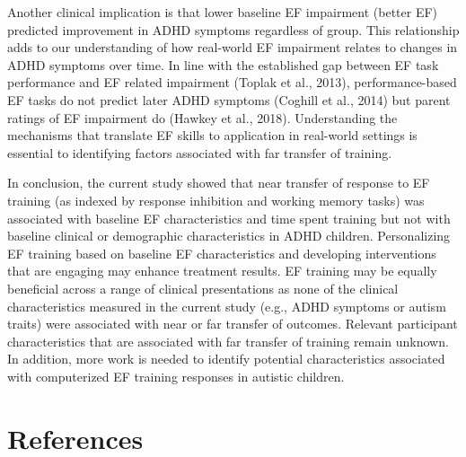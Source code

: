 \documentclass[
  letterpaper,
]{ut-thesis}
\begin{document}
Another clinical implication is that lower baseline EF impairment
(better EF) predicted improvement in ADHD symptoms regardless of group.
This relationship adds to our understanding of how real-world EF
impairment relates to changes in ADHD symptoms over time. In line with
the established gap between EF task performance and EF related
impairment (Toplak et al., 2013), performance-based EF tasks do not
predict later ADHD symptoms (Coghill et al., 2014) but parent ratings of
EF impairment do (Hawkey et al., 2018). Understanding the mechanisms
that translate EF skills to application in real-world settings is
essential to identifying factors associated with far transfer of
training.

In conclusion, the current study showed that near transfer of response
to EF training (as indexed by response inhibition and working memory
tasks) was associated with baseline EF characteristics and time spent
training but not with baseline clinical or demographic characteristics
in ADHD children. Personalizing EF training based on baseline EF
characteristics and developing interventions that are engaging may
enhance treatment results. EF training may be equally beneficial across
a range of clinical presentations as none of the clinical
characteristics measured in the current study (e.g., ADHD symptoms or
autism traits) were associated with near or far transfer of outcomes.
Relevant participant characteristics that are associated with far
transfer of training remain unknown. In addition, more work is needed to
identify potential characteristics associated with computerized EF
training responses in autistic children.


\chapter*{References}\label{references}

\end{document}
